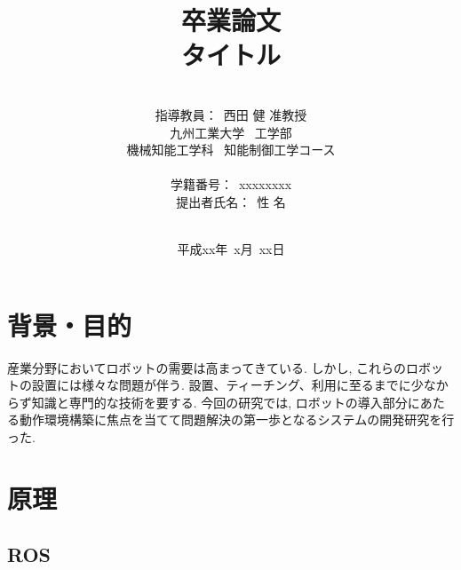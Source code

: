 \documentclass[a4paper,12pt]{jarticle}
\title{卒業論文\\
タイトル\\
}
\author{\vspace{90mm}\\
指導教員：\ 西田 \hspace{0mm} 健 准教授\\
九州工業大学\ \hspace{0mm} 工学部\\
機械知能工学科\ \hspace{0mm} 知能制御工学コース \\
\vspace{0mm}\\
学籍番号：\ xxxxxxxx\\
提出者氏名：\ 性 \hspace{0mm} 名\\\vspace{5mm}\\ }
\date{平成xx年\ x月\ xx日}
\begin{document}
\titlepage
\maketitle
\thispagestyle{empty}
\newpage

\begin{abstract}
\end{abstract}
\thispagestyle{empty}

\thispagestyle{empty}
\tableofcontents
\newpage

\section{背景・目的}
\label{sec:背景・目的}
産業分野においてロボットの需要は高まってきている. しかし, これらのロボットの設置には様々な問題が伴う. 設置、ティーチング、利用に至るまでに少なからず知識と専門的な技術を要する. 今回の研究では, ロボットの導入部分にあたる動作環境構築に焦点を当てて問題解決の第一歩となるシステムの開発研究を行った. 


\section{原理}
\label{sec:原理}
\subsection{ROS}
\label{sec:ROS}
\end{document}
